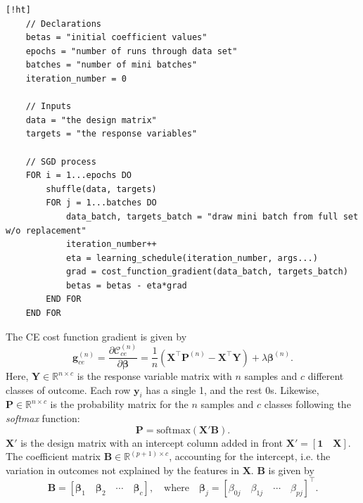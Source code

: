 \documentclass[]{article}
\begin{document}
\begin{lstlisting}[caption={Stochastic Gradient Descent algorithm. Cost function gradients and learning schedules may be defined independently of the implementation of SGD. This implementation runs for \lstinline|epochs*batches| iterations, and does not sense if or when it converges.},label={lst:sgd}] [!ht]
	// Declarations
	betas = "initial coefficient values"
	epochs = "number of runs through data set"
	batches = "number of mini batches"
	iteration_number = 0
	
	// Inputs
	data = "the design matrix"
	targets = "the response variables"
	
	// SGD process	
	FOR i = 1...epochs DO
		shuffle(data, targets)
		FOR j = 1...batches DO
			data_batch, targets_batch = "draw mini batch from full set w/o replacement"
			iteration_number++
			eta = learning_schedule(iteration_number, args...)
			grad = cost_function_gradient(data_batch, targets_batch)
			betas = betas - eta*grad
		END FOR
	END FOR
\end{lstlisting}

The CE cost function gradient is given by
\begin{equation} \label{cost-mse}
	\mathbf{g}_{ce}^{(n)} = \frac{\partial \mathcal{C}_{ce}^{(n)}}{\partial \mathbf{\beta}} = \frac{1}{n} (\mathbf{X}^\intercal \mathbf{P}^{(n)} - \mathbf{X}^\intercal \mathbf{Y}) + \lambda \mathbf{\beta}^{(n)}.
\end{equation}
Here, $\mathbf{Y} \in \mathbb{R}^{n \times c}$ is the response variable matrix with $n$ samples and $c$ different classes of outcome. Each row $\mathbf{y}_i$ has a single 1, and the rest 0s. Likewise, $\mathbf{P} \in \mathbb{R}^{n \times c}$ is the probability matrix for the $n$ samples and $c$ classes following the \textit{softmax} function:
\begin{equation}
	\mathbf{P} = \mathrm{softmax}(\mathbf{X}'\mathbf{B}).
\end{equation}
$\mathbf{X}'$ is the design matrix with an intercept column added in front $\mathbf{X}' = [\mathbf{1} \quad \mathbf{X}]$. The coefficient matrix $\mathbf{B} \in \mathbb{R}^{(p+1) \times c}$, accounting for the intercept, i.e. the variation in outcomes not explained by the features in $\mathbf{X}$. $\mathbf{B}$ is given by
\begin{equation}
	\mathbf{B} = [\mathbf{\beta}_1 \quad \mathbf{\beta}_2 \quad \cdots \quad \mathbf{\beta}_c], \quad \text{where} \quad \mathbf{\beta}_j = [\beta_{0j} \quad \beta_{1j} \quad \cdots \quad \beta_{pj}]^\intercal.
\end{equation}
\end{document}
